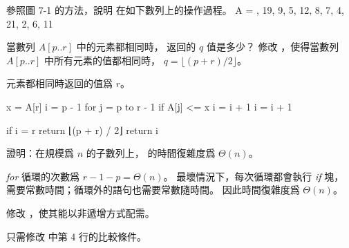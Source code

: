 \startsection[
  reference=section:desc_quicksort,
  title={Description of quicksort},
]

\startEXERCISE
參照圖 7-1 的方法，說明  在如下數列上的操作過程。
\startformula
A = , 19, 9, 5, 12, 8, 7, 4, 21, 2, 6, 11 \rangle
\stopformula
\stopEXERCISE

\startANSWER
{\externalfigure[e7_1_1-1]}
{\externalfigure[e7_1_1-2]}
{\externalfigure[e7_1_1-3]}
{\externalfigure[e7_1_1-4]}
{\externalfigure[e7_1_1-5]}
{\externalfigure[e7_1_1-6]}
{\externalfigure[e7_1_1-7]}
{\externalfigure[e7_1_1-8]}
{\externalfigure[e7_1_1-9]}
{\externalfigure[e7_1_1-10]}
{\externalfigure[e7_1_1-11]}
{\externalfigure[e7_1_1-12]}
{\externalfigure[e7_1_1-13]}
\stopANSWER

當數列 $A[p..r]$ 中的元素都相同時，  返回的 $q$ 值是多少？
修改 ，使得當數列 $A[p..r]$ 中所有元素的值都相同時，
 $q=\lfloor (p+r)/2\rfloor$。
\stopEXERCISE

\startANSWER
元素都相同時返回的值爲 $r$。

\startCLRSCODE
x = A[r]
i = p - 1
for j = p to r - 1
	if A[j] <= x
		i = i + 1
i = i + 1

if i = r
	return ⌊(p + r) / 2⌋
return i
\stopCLRSCODE
\stopANSWER

\startEXERCISE
證明：在規模爲 $n$ 的子數列上，  的時間復雜度爲 $\Theta(n)$。
\stopEXERCISE

\startANSWER
\emph{for} 循環的次數爲 $r - 1 - p = \Theta(n)$。
最壞情況下，每次循環都會執行 \emph{if} 塊，
需要常數時間；循環外的語句也需要常數隨時間。
因此時間復雜度爲 $\Theta(n)$。
\stopANSWER

\startEXERCISE
修改 ，使其能以非遞增方式配需。
\stopEXERCISE

\startANSWER
只需修改  中第 4 行的比較條件。
\stopANSWER

\stopsection
